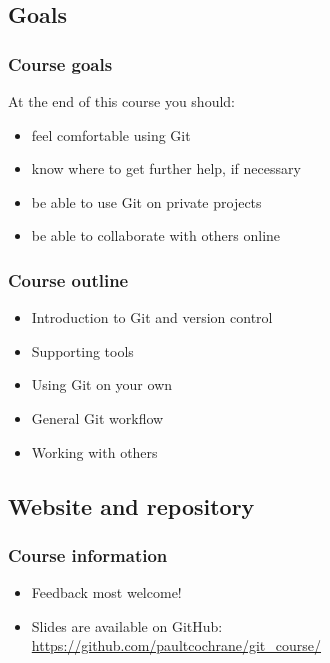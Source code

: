 \subsection{Goals}

\begin{frame}
\frametitle{Course goals}

At the end of this course you should:

\begin{itemize}
    \item feel comfortable using Git
    \item know where to get further help, if necessary
    \item be able to use Git on private projects
    \item be able to collaborate with others online
\end{itemize}
\end{frame}

\begin{frame}
\frametitle{Course outline}
\begin{itemize}
    \item Introduction to Git and version control
    \item Supporting tools
    \item Using Git on your own
    \item General Git workflow
    \item Working with others
\end{itemize}
\end{frame}


\subsection{Website and repository}
\begin{frame}
\frametitle{Course information}
\begin{itemize}
    \item Feedback most welcome!
    \item Slides are available on GitHub:\\
        {\footnotesize \url{https://github.com/paultcochrane/git\_course/}}
\end{itemize}
\end{frame}

